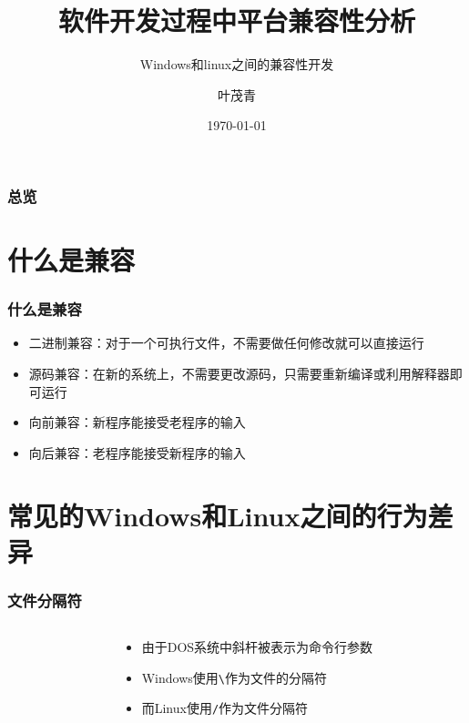 \documentclass[hyperref={pdfpagelabels=false}]{beamer}
\title{软件开发过程中平台兼容性分析}
\subtitle{Windows和linux之间的兼容性开发}
\author{叶茂青}
\date{\today}
\begin{document}
\begin{frame}
\titlepage
\end{frame} 

\begin{frame}
	\frametitle{总览}
	\tableofcontents
\end{frame} 

\section{什么是兼容}
\begin{frame}
	\tableofcontents[currentsection]
\end{frame} 

\begin{frame}
	\frametitle{什么是兼容}
	\begin{itemize}
		\item 二进制兼容：对于一个可执行文件，不需要做任何修改就可以直接运行
		\item 源码兼容：在新的系统上，不需要更改源码，只需要重新编译或利用解释器即可运行
		\item 向前兼容：新程序能接受老程序的输入
		\item 向后兼容：老程序能接受新程序的输入
	\end{itemize}
\end{frame}

\section{常见的Windows和Linux之间的行为差异}
\begin{frame}
	\tableofcontents[currentsection]
\end{frame}

\begin{frame}
	\frametitle{文件分隔符}
	\begin{columns}
		\begin{column}{.5\linewidth}
			
		\end{column}
	
		\begin{column}{.5\linewidth}
			\begin{itemize}
				\item 由于DOS系统中斜杆被表示为命令行参数
				\item Windows使用\texttt{\textbackslash}作为文件的分隔符
				\item 而Linux使用\texttt{/}作为文件分隔符
			\end{itemize}
		\end{column}
	\end{columns}
\end{frame}
\end{document}
